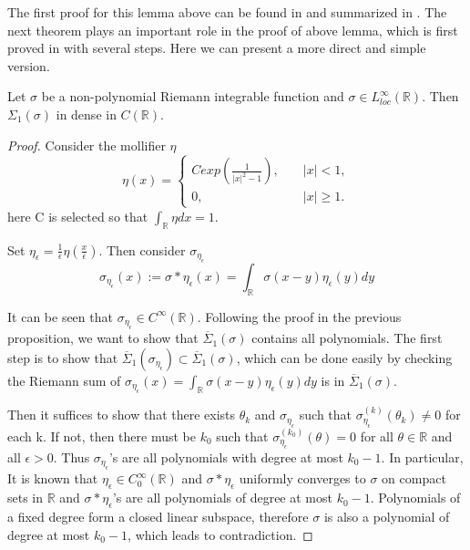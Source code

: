 	\fi

The first proof for this lemma above can be found in \cite{leshno1993multilayer} and summarized in \cite{pinkus1999approximation}.
The next theorem plays an important role in the proof of above lemma, which is first proved
in \cite{leshno1993multilayer} with several steps. Here we can present a more direct and simple version.
%
%
%
%

\begin{theorem}
	\label{prop:conti}
Let $\sigma$ be a non-polynomial Riemann integrable function and $\sigma\in L_{loc}^\infty(\mathbb{R})$. Then $\Sigma_1(\sigma)$ in dense in $C(\mathbb{R})$.
\end{theorem}
\begin{proof}
	Consider the mollifier $\eta$
	\begin{equation*}\eta(x)=\left\{
	\begin{aligned}
	Cexp(\frac{1}{|x|^2-1}),\quad&|x|<1,\\
 	0,\qquad\qquad\qquad\quad  &|x|\ge1.
	\end{aligned}
	\right.
	\end{equation*}
	here C is selected so that $\int_{\mathbb{R}}\eta dx=1.$
	
	Set $\eta_\epsilon=\frac{1}{\epsilon}\eta(\frac{x}{\epsilon})$. Then consider $\sigma_{\eta_\epsilon}$
\begin{equation}
	\sigma_{\eta_\epsilon}(x):=\sigma\ast{\eta_\epsilon}(x)=\int_{\mathbb{R}}\sigma(x-y){\eta_\epsilon}(y)dy
\end{equation}

It can be seen that $\sigma_{\eta_\epsilon}\in
C^\infty(\mathbb{R})$. Following the proof in the previous
proposition, we want to show that $\overline{\Sigma}_1(\sigma)$
contains all polynomials.  The first step is to show that
$\overline{\Sigma}_1(\sigma_{\eta_\epsilon})\subset\overline{\Sigma}_1(\sigma)$,
which can be done easily by checking the Riemann sum of
$\sigma_{\eta_\epsilon}(x)=\int_{\mathbb{R}}\sigma(x-y){\eta_\epsilon}(y)dy$
is in $\overline{\Sigma}_1(\sigma)$.

Then it suffices to show that there exists $\theta_k$ and
$\sigma_{\eta_\epsilon}$ such that
$\sigma_{\eta_\epsilon}^{(k)}(\theta_k)\ne0$ for each k. If not, then
there must be $k_0$ such that
$\sigma_{\eta_\epsilon}^{(k_0)}(\theta)=0$ for all
$\theta\in\mathbb{R}$ and all $\epsilon>0$.  Thus
$\sigma_{\eta_\epsilon}$'s are all polynomials with degree at most
$k_0-1$.  In particular, It is known that $\eta_\epsilon\in
C_0^\infty(\mathbb{R})$ and $\sigma\ast\eta_\epsilon$ uniformly
converges to $\sigma$ on compact sets in $\mathbb{R}$ and
$\sigma\ast\eta_\epsilon$'s are all polynomials of degree at most
$k_0-1$. Polynomials of a fixed degree form a closed linear subspace,
therefore $\sigma$ is also a polynomial of degree at most $k_0-1$,
which leads to contradiction.
\end{proof}

